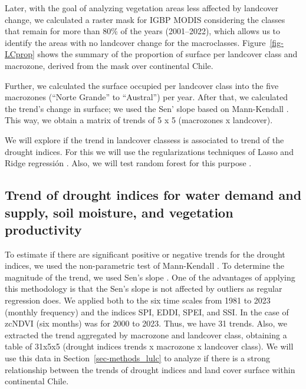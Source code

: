 \documentclass[
  authoryear,
  preprint,
  3p,
  onecolumn]{elsarticle}
\begin{document}
Later, with the goal of analyzing vegetation areas less affected by
landcover change, we calculated a raster mask for IGBP MODIS considering
the classes that remain for more than 80\% of the years (2001--2022),
which allows us to identify the areas with no landcover change for the
macroclasses. Figure~\ref{fig-LCprop} shows the summary of the
proportion of surface per landcover class and macrozone, derived from
the mask over continental Chile.

Further, we calculated the surface occupied per landcover class into the
five macrozones (``Norte Grande'' to ``Austral'') per year. After that,
we calculated the trend's change in surface; we used the Sen' slope
\citep{Sen1968} based on Mann-Kendall \citep{Kendall1975}. This way, we
obtain a matrix of trends of 5 x 5 (macrozones x landcover).

We will explore if the trend in landcover classess is associated to
trend of the drought indices. For this we will use the regularizations
techniques of Lasso \citep{Tibshirani2010} and Ridge regressión
\citep{Hoerl1970}. Also, we will test random forest for this purpose
\citep{Ho1995}.

\hypertarget{trend-of-drought-indices-for-water-demand-and-supply-soil-moisture-and-vegetation-productivity}{%
\subsection{Trend of drought indices for water demand and supply, soil
moisture, and vegetation
productivity}\label{trend-of-drought-indices-for-water-demand-and-supply-soil-moisture-and-vegetation-productivity}}

To estimate if there are significant positive or negative trends for the
drought indices, we used the non-parametric test of Mann-Kendall
\citep{Kendall1975}. To determine the magnitude of the trend, we used
Sen's slope \citep{Sen1968}. One of the advantages of applying this
methodology is that the Sen's slope is not affected by outliers as
regular regression does. We applied both to the six time scales from
1981 to 2023 (monthly frequency) and the indices SPI, EDDI, SPEI, and
SSI. In the case of zcNDVI (six months) was for 2000 to 2023. Thus, we
have 31 trends. Also, we extracted the trend aggregated by macrozone and
landcover class, obtaining a table of 31x5x5 (drought indices trends x
macrozone x landcover class). We will use this data in
Section~\ref{sec-methods_lulc} to analyze if there is a strong
relationship between the trends of drought indices and land cover
surface within continental Chile.
\end{document}
